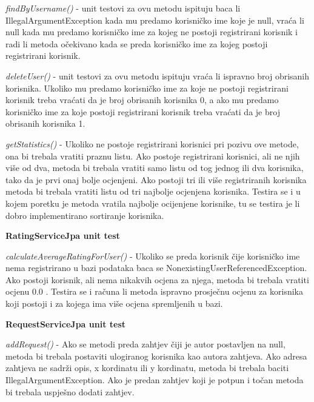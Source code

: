 			\textit{findByUsername()} - unit testovi za ovu metodu ispituju baca li IllegalArgumentException kada mu predamo korisničko ime koje je null, vraća li null kada mu predamo korisničko ime za kojeg ne postoji registrirani korisnik i radi li metoda očekivano kada se preda korisničko ime za kojeg postoji registrirani korisnik.
			
			\textit{deleteUser()} - unit testovi za ovu metodu ispituju vraća li ispravno broj obrisanih korisnika. Ukoliko mu predamo korisničko ime za koje ne postoji registrirani korisnik treba vraćati da je broj obrisanih korisnika 0, a ako mu predamo korisničko ime za koje postoji registrirani korisnik treba vraćati da je broj obrisanih korisnika 1.
			
			\textit{getStatistics()} - Ukoliko ne postoje registrirani korisnici pri pozivu ove metode, ona bi trebala vratiti praznu listu. Ako postoje registrirani korisnici, ali ne njih više od dva, metoda bi trebala vratiti samo listu od tog jednog ili dva korisnika, tako da je prvi onaj bolje ocjenjeni. Ako postoji tri ili više registriranih korisnika metoda bi trebala vratiti listu od tri najbolje ocjenjena korisnika. Testira se i u kojem poretku je metoda vratila najbolje ocijenjene korisnike, tu se testira je li dobro implementirano sortiranje korisnika.
			
			\bigskip
			\bigskip
			\textbf{RatingServiceJpa unit test}
			\bigskip
			
			\textit{calculateAverageRatingForUser()} - Ukoliko se preda korisnik čije korisničko ime nema registrirano u bazi podataka baca se NonexistingUserReferencedException. Ako postoji korisnik, ali nema nikakvih ocjena za njega, metoda bi trebala vratiti ocjenu 0.0 . Testira se i računa li metoda ispravno prosječnu ocjenu za korisnika koji postoji i za kojega ima više ocjena spremljenih u bazi.
			
			\bigskip
			\bigskip
			\textbf{RequestServiceJpa unit test}
			\bigskip
			
			\textit{addRequest()} - Ako se metodi preda zahtjev čiji je autor postavljen na null, metoda bi trebala postaviti ulogiranog korisnika kao autora zahtjeva. Ako adresa zahtjeva ne sadrži opis, x kordinatu ili y kordinatu, metoda bi trebala baciti IllegalArgumentException. Ako je predan zahtjev koji je potpun i točan metoda bi trebala uspješno dodati zahtjev.
			
